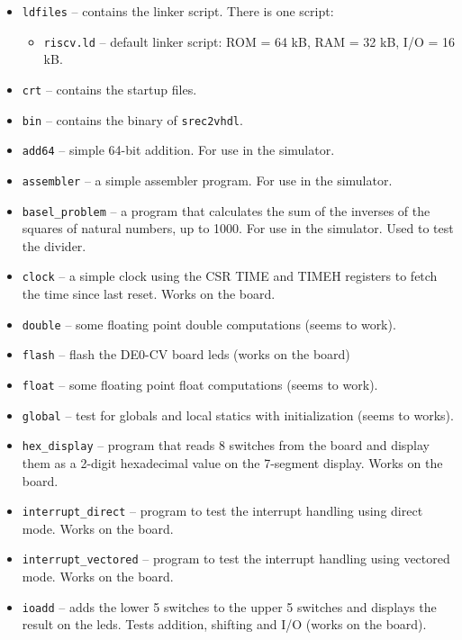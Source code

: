 \documentclass[12pt]{article}
\begin{document}
\begin{itemize}
\item \texttt{ldfiles} -- contains the linker script. There is one script:
\begin{itemize}
\item \texttt{riscv.ld} -- default linker script: ROM = 64 kB, RAM = 32 kB, I/O = 16 kB.
\end{itemize}
\item \texttt{crt} -- contains the startup files.
\item \texttt{bin} -- contains the binary of \texttt{srec2vhdl}.
\item \texttt{add64} -- simple 64-bit addition. For use in the simulator.
\item \texttt{assembler} -- a simple assembler program. For use in the simulator.
\item \texttt{basel\_problem} -- a program that calculates the sum of the inverses of the squares of natural numbers, up to 1000. For use in the simulator. Used to test the divider.
\item \texttt{clock} -- a simple clock using the CSR TIME and TIMEH registers to fetch the time since last reset. Works on the board.
\item \texttt{double} -- some floating point double computations (seems to work).
\item \texttt{flash} -- flash the DE0-CV board leds (works on the board)
\item \texttt{float} -- some floating point float computations (seems to work).
\item \texttt{global} -- test for globals and local statics with initialization (seems to works).
\item \texttt{hex\_display} -- program that reads 8 switches from the board and display them as a 2-digit hexadecimal value on the 7-segment display. Works on the board.
\item \texttt{interrupt\_direct} -- program to test the interrupt handling using direct mode. Works on the board.
\item \texttt{interrupt\_vectored} -- program to test the interrupt handling using vectored mode. Works on the board.
\item \texttt{ioadd} -- adds the lower 5 switches to the upper 5 switches and displays the result on the leds. Tests addition, shifting and I/O (works on the board).

\end{itemize}
\end{document}
